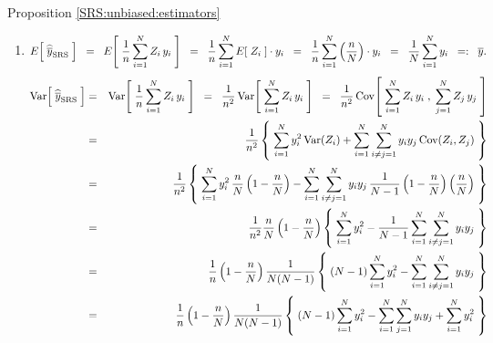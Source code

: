 \documentclass{article}
\begin{document}
\proofof Proposition \ref{SRS:unbiased:estimators}
\begin{enumerate}
\item  \begin{equation*}
                        E\!\left[\;\widehat{\overline{y}}_{\textnormal{SRS}}\;\right]
             \;\;=\;\;   E\!\left[\; \dfrac{1}{n}\sum_{i=1}^{N} Z_{i} \, y_{i} \;\right]
             \;\;=\;\;  \dfrac{1}{n} \sum^{N}_{i=1}E\!\left[\; Z_{i} \;\right]\cdot y_{i}
             \;\;=\;\;  \dfrac{1}{n} \sum^{N}_{i=1}\left(\dfrac{n}{N}\right)\cdot y_{i} 
             \;\;=\;\;  \dfrac{1}{N} \sum^{N}_{i=1} y_{i}
             \;\;=:\;\; \overline{y}.
          \end{equation*}
          \begin{eqnarray*}
                         \textnormal{Var}\!\left[\; \widehat{\overline{y}}_{\textnormal{SRS}} \;\right]
              & = &  \textnormal{Var}\!\left[\; \dfrac{1}{n}\sum_{i=1}^{N} Z_{i} \, y_{i} \;\right]
              \;\;=\;\; \dfrac{1}{n^{2}}\,\textnormal{Var}\!\left[\; \sum_{i=1}^{N} Z_{i} \, y_{i} \;\right]
              \;\;=\;\; \dfrac{1}{n^{2}}\,\textnormal{Cov}\!\left[\; \sum_{i=1}^{N} Z_{i} \, y_{i} \;,\; \sum_{j=1}^{N} Z_{j} \, y_{j} \;\right] \\
              & = &  \dfrac{1}{n^{2}}\left\{\;\sum^{N}_{i=1}y_{i}^{2}\,\textnormal{Var}(Z_{i})
                                                        + \sum^{N}_{i=1}\sum_{i\neq j=1}^{N} y_{i}y_{j}\,\textnormal{Cov}(Z_{i},Z_{j})\;\right\} \\
              & = &  \dfrac{1}{n^{2}}\left\{\;\sum^{N}_{i=1}y_{i}^{2}\,\dfrac{n}{N}\left(1-\dfrac{n}{N}\right)
                        - \sum^{N}_{i=1}\sum_{i\neq j=1}^{N} y_{i}y_{j}\,\dfrac{1}{N-1}\left(1-\dfrac{n}{N}\right)\left(\dfrac{n}{N}\right)\;\right\} \\
              & = &  \dfrac{1}{n^{2}}\dfrac{n}{N}\left(1-\dfrac{n}{N}\right)\left\{\;\sum^{N}_{i=1}y_{i}^{2}
                        - \dfrac{1}{N-1}\sum^{N}_{i=1}\sum_{i\neq j=1}^{N} y_{i}y_{j}\;\right\} \\
              & = &  \dfrac{1}{n}\left(1-\dfrac{n}{N}\right)\dfrac{1}{N(N-1)}\left\{\;(N-1)\sum^{N}_{i=1}y_{i}^{2}
                        - \sum^{N}_{i=1}\sum_{i\neq j=1}^{N} y_{i}y_{j}\;\right\} \\
              & = &  \dfrac{1}{n}\left(1-\dfrac{n}{N}\right)\dfrac{1}{N(N-1)}\left\{\;(N-1)\sum^{N}_{i=1}y_{i}^{2}
                        - \sum^{N}_{i=1}\sum_{j=1}^{N} y_{i}y_{j} + \sum^{N}_{i=1}y_{i}^{2}\;\right\} \\

\end{eqnarray*}
\end{enumerate}
\end{document}
